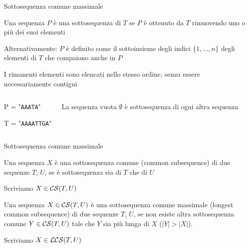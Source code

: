 \begin{frame}{Sottosequenza comune massimale}

\vspace{-9pt}
\begin{myboxtitle}
\BIL
\item Una sequenza $P$ è una \alert{sottosequenza} di $T$ se $P$ è ottenuto da $T$
rimuovendo uno o più dei suoi elementi
\item Alternativamente: $P$ è definito come il sottoinsieme degli indici $\{ 1, \ldots, n \}$
degli elementi di $T$ che compaiono anche in $P$
\item I rimanenti elementi sono elencati nello stesso ordine, senza essere necessariamente contigui
\EIL
\end{myboxtitle}

\vspace{-9pt}
\begin{columns}[T]
\begin{myboxtitle}[Esempi]
\BI
\item P = "\texttt{AAATA}"
\item T = "\texttt{\alert{AAA}AT\alert{T}G\alert{A}}"
\EI
\end{myboxtitle}
\begin{myboxtitle}[Note]
\smallskip
La sequenza vuota $\emptyset$ è sottosequenza di ogni altra sequenza
\end{myboxtitle}
\end{columns}

\end{frame}


\begin{frame}{Sottosequenza comune massimale}


\vspace{-9pt}
\begin{myboxtitle}
Una sequenza $X$ è una \alert{sottosequenza comune} (\alert{common subsequence}) di due sequenze $T$, $U$, se è sottosequenza sia di $T$ che di $U$

\BIL
\item Scriviamo $X \in {\cal CS}(T,U)$
\EIL
\end{myboxtitle}

\begin{myboxtitle}
Una sequenza $X \in {\cal CS}(T,U)$ è una \alert{sottosequenza comune massimale} (\alert{longest common subsequence}) di due sequenze $T$, $U$, se non esiste altra sottosequenza comune $Y \in {\cal CS}(T,U)$ tale che $Y$ sia più lunga di $X$ ($|Y|>|X|$).

\BIL
\item Scriviamo $X \in {\cal LCS}(T,U)$
\EIL
\end{myboxtitle}

\end{frame}


